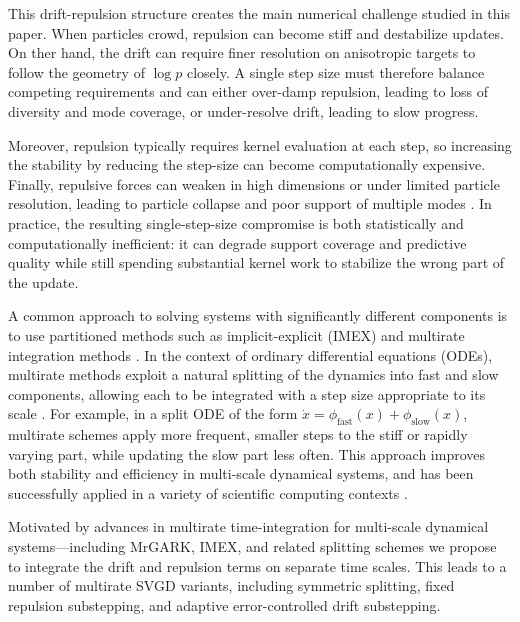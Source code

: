 This drift-repulsion structure creates the main numerical challenge studied in
this paper. When particles crowd, repulsion can become stiff and destabilize
updates. On ther hand, the drift can require finer resolution on anisotropic targets to
follow the geometry of $\log p$ closely. A single step size must therefore
balance competing requirements and can either over-damp repulsion, leading to
loss of diversity and mode coverage, or under-resolve drift, leading to slow
progress.

Moreover, repulsion typically requires kernel evaluation at each
step, so increasing the stability by reducing  the step-size can become
computationally expensive. Finally, repulsive forces can weaken in high
dimensions or under limited particle resolution, leading to particle collapse
and poor support of multiple modes \cite{pmlr-v80-zhuo18a,pmlr-v108-zhang20d}.
In practice, the resulting single-step-size compromise is both statistically
and computationally inefficient: it can degrade support coverage and predictive
quality while still spending substantial kernel work to stabilize the wrong
part of the update.


A common approach to solving systems with significantly different 
components is to use partitioned methods such as implicit-explicit (IMEX)  \cite{Pareschi_2000,sarshar2020parimex} and
multirate integration methods \cite{Sandu_2016_MR-GARK}.  In the context of ordinary
differential equations (ODEs), multirate methods exploit a natural splitting of the dynamics into 
fast and slow components, allowing each to be integrated with a step size appropriate
to its scale \cite{sarshar2019mrgark,sarshar2021implicitgark,sarshar2021glmadi}. 
For example, in a split ODE of the form $\dot{x} = \phi_{\text{fast}}(x) + \phi_{\text{slow}}(x)$, multirate schemes
apply more frequent, smaller steps to the stiff or rapidly varying part, while updating the
slow part less often. This approach improves both stability and efficiency in multi-scale
dynamical systems, and has been successfully applied in a variety of scientific computing contexts \cite{sarshar2020parimex,sarshar2022surrogate}. 

Motivated by advances in multirate time-integration
for multi-scale dynamical systems—including MrGARK, IMEX, and related splitting schemes \cite{sarshar2019mrgark,sarshar2021implicitgark,sarshar2021glmadi} we propose to integrate the drift and repulsion terms on separate time scales. This leads to a number of multirate SVGD variants, including symmetric splitting, fixed repulsion substepping, and adaptive error-controlled drift substepping.

